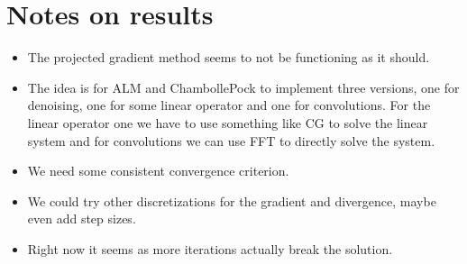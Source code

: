 \documentclass{article}
\begin{document}
\section{Notes on results}

\begin{itemize}
  \item The projected gradient method seems to not be functioning as it should.
  \item The idea is for ALM and ChambollePock to implement three versions,
    one for denoising, one for some linear operator and one for convolutions. 
    For the linear operator one we have to use something like CG to solve
    the linear system and for convolutions we can use FFT
    to directly solve the system.
  \item We need some consistent convergence criterion.
  \item We could try other discretizations for the gradient and
    divergence, maybe even add step sizes.
  \item Right now it seems as more iterations actually break
    the solution.
\end{itemize}
\end{document}
